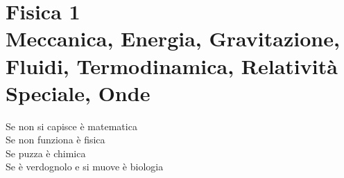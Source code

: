 \part[Fisica 1]{Fisica 1\\\vspace{1cm}\large{Meccanica, Energia, Gravitazione, Fluidi, Termodinamica, Relatività Speciale, Onde}}
\parttoc
\mtcskip


\begin{savequote}
  Se non si capisce è matematica\\
  Se non funziona è fisica\\
  Se puzza è chimica\\
  Se è verdognolo e si muove è biologia\\
\end{savequote}






